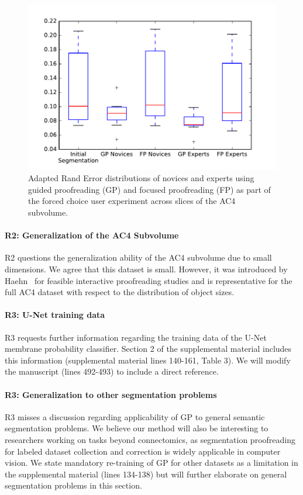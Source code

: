 \documentclass[10pt,twocolumn,letterpaper]{article}
\begin{document}
\begin{figure}[h]
\begin{center}
  \includegraphics[width=\linewidth]{gfx/are_plot.pdf}
\end{center}
\vspace{-4mm}
   \caption{Adapted Rand Error distributions of novices and experts using guided proofreading (GP) and focused proofreading (FP) as part of the forced choice user experiment across slices of the AC4 subvolume.}
\label{fig:randerror}
\end{figure}

\paragraph{R2: Generalization of the AC4 Subvolume} R2 questions the generalization ability of the AC4 subvolume due to small dimensions. We agree that this dataset is small. However, it was introduced by Haehn~ for feasible interactive proofreading studies and is representative for the full AC4 dataset with respect to the distribution of object sizes.

\paragraph{R3: U-Net training data} R3 requests further information regarding the training data of the U-Net membrane probability classifier. Section 2 of the supplemental material includes this information (supplemental material lines 140-161, Table 3). We will modify the manuscript (lines 492-493) to include a direct reference.

\paragraph{R3: Generalization to other segmentation problems} R3 misses a  discussion regarding applicability of GP to general semantic segmentation problems. We believe our method will also be interesting to researchers working on tasks beyond connectomics, as segmentation proofreading for labeled dataset collection and correction is widely applicable in computer vision. We state mandatory re-training of GP for other datasets as a limitation in the supplemental material (lines 134-138) but will further elaborate on general segmentation problems in this section.
\end{document}
